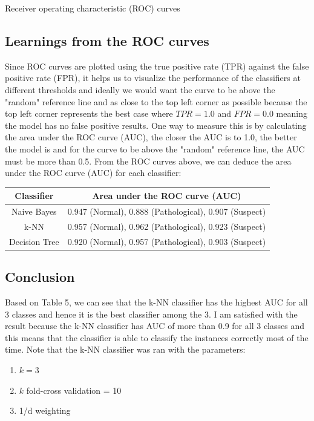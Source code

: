 \documentclass[12pt]{article}
\begin{document}
\begin{section}{Receiver operating characteristic (ROC) curves}
 \subsection{Learnings from the ROC curves}
 Since ROC curves are plotted using the true positive rate (TPR) against the false positive rate (FPR), it
 helps us to visualize the performance of the classifiers at different thresholds and ideally we would want
 the curve to be above the "random" reference line and as close to the top left corner as possible because
 the top left corner represents the best case where $TPR = 1.0$ and $FPR = 0.0$ meaning the model has no
 false positive results. One way to measure this is by calculating the area under the ROC curve (AUC), the
 closer the AUC is to 1.0, the better the model is and for the curve to be above the "random" reference line,
 the AUC must be more than 0.5. From the ROC curves above, we can deduce the area under the ROC curve (AUC)
 for each classifier:

 \begin{center}
     \begin{tabular}{| c | c |}
         \hline
         \textbf{Classifier} & \textbf{Area under the ROC curve (AUC)}               \\ [0.5ex]
         \hline
         Naive Bayes         & 0.947 (Normal), 0.888 (Pathological), 0.907 (Suspect) \\
         \hline
         k-NN                & 0.957 (Normal), 0.962 (Pathological), 0.923 (Suspect) \\
         \hline
         Decision Tree       & 0.920 (Normal), 0.957 (Pathological), 0.903 (Suspect) \\
         \hline
     \end{tabular}
 \end{center}

 \subsection{Conclusion}
 Based on Table 5, we can see that the k-NN classifier has the highest AUC for all 3 classes and hence
 it is the best classifier among the 3. I am satisfied with the result because the k-NN classifier has AUC of more than 0.9
 for all 3 classes and this means that the classifier is able to classify the instances correctly most of the time. Note that the k-NN classifier was ran with the parameters:

 \begin{enumerate}
     \item $k = 3$
     \item $k$ fold-cross validation = 10
     \item 1/d weighting
 \end{enumerate}
\end{section}
\end{document}
